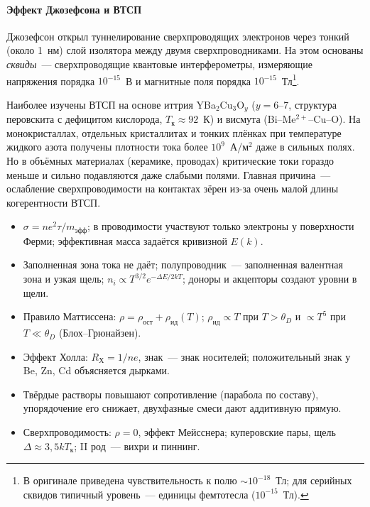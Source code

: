 \paragraph{Эффект Джозефсона и ВТСП}
Джозефсон открыл туннелирование сверхпроводящих электронов через
тонкий (около 1~нм) слой изолятора между двумя сверхпроводниками. На
этом основаны \emph{сквиды}~— сверхпроводящие квантовые интерферометры,
измеряющие напряжения порядка $10^{-15}$~В и магнитные поля порядка
$10^{-15}$~Тл\footnote{В оригинале приведена чувствительность к полю
$\sim10^{-18}$~Тл; для серийных сквидов типичный уровень~— единицы
фемтотесла ($10^{-15}$~Тл).}.

Наиболее изучены ВТСП на основе иттрия YBa$_2$Cu$_3$O$_y$ ($y=6$--7, структура
перовскита с дефицитом кислорода, $T_\text{к}\approx92$~К) и висмута
(Bi--Me$^{2+}$--Cu--O). На монокристаллах, отдельных кристаллитах и тонких
плёнках при температуре жидкого азота получены плотности тока более
$10^9$~А/м$^2$ даже в сильных полях. Но в объёмных материалах (керамике,
проводах) критические токи гораздо меньше и сильно подавляются даже
слабыми полями. Главная причина~— ослабление сверхпроводимости на
контактах зёрен из-за очень малой длины когерентности ВТСП.

\begin{itogi}
\begin{itemize}
\item $\sigma=ne^2\tau/m_\text{эфф}$; в проводимости участвуют только
электроны у поверхности Ферми; эффективная масса задаётся кривизной
$E(k)$.
\item Заполненная зона тока не даёт; полупроводник~— заполненная
валентная зона и узкая щель; $n_i\propto T^{3/2}e^{-\Delta E/2kT}$;
доноры и акцепторы создают уровни в щели.
\item Правило Маттиссена: $\rho=\rho_\text{ост}+\rho_\text{ид}(T)$;
$\rho_\text{ид}\propto T$ при $T>\theta_D$ и $\propto T^5$ при $T\ll\theta_D$
(Блох--Грюнайзен).
\item Эффект Холла: $R_\text{Х}=1/ne$, знак~— знак носителей; положительный
знак у Be, Zn, Cd объясняется дырками.
\item Твёрдые растворы повышают сопротивление (парабола по составу),
упорядочение его снижает, двухфазные смеси дают аддитивную прямую.
\item Сверхпроводимость: $\rho=0$, эффект Мейсснера; куперовские пары,
щель $\Delta\approx3{,}5kT_\text{к}$; II род~— вихри и пиннинг.
\end{itemize}
\end{itogi}

